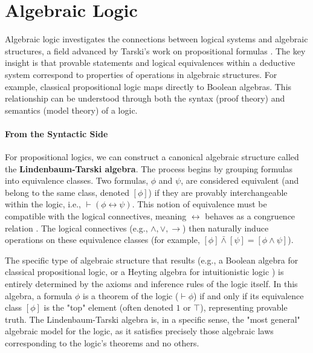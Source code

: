 

\section{Algebraic Logic}
Algebraic logic investigates the connections between logical systems and algebraic structures, a field advanced by Tarski's work on propositional formulas \cite[p.~1]{BlokPigozzi1989}. The key insight is that provable statements and logical equivalences within a deductive system correspond to properties of operations in algebraic structures. For example, classical propositional logic maps directly to Boolean algebras. This relationship can be understood through both the syntax (proof theory) and semantics (model theory) of a logic.

\paragraph{From the Syntactic Side} For propositional logics, we can construct a canonical algebraic structure called the \textbf{Lindenbaum-Tarski algebra}. The process begins by grouping formulas into equivalence classes. Two formulas, $\phi$ and $\psi$, are considered equivalent (and belong to the same class, denoted $[\phi]$) if they are provably interchangeable within the logic, i.e., $\vdash (\phi \leftrightarrow \psi)$. This notion of equivalence must be compatible with the logical connectives, meaning $\leftrightarrow$ behaves as a congruence relation \cite[p.~1-2]{BlokPigozzi1989}. The logical connectives (e.g., $\wedge, \lor, \rightarrow$) then naturally induce operations on these equivalence classes (for example, $[\phi] \bar{\wedge} [\psi] = [\phi \wedge \psi]$).

The specific type of algebraic structure that results (e.g., a Boolean algebra for classical propositional logic, or a Heyting algebra for intuitionistic logic \cite[Ch.~1]{ResiduatedLattices2007}) is entirely determined by the axioms and inference rules of the logic itself. In this algebra, a formula $\phi$ is a theorem of the logic ($\vdash \phi$) if and only if its equivalence class $[\phi]$ is the "top" element (often denoted $1$ or $\top$), representing provable truth. The Lindenbaum-Tarski algebra is, in a specific sense, the "most general" algebraic model for the logic, as it satisfies precisely those algebraic laws corresponding to the logic's theorems and no others.

